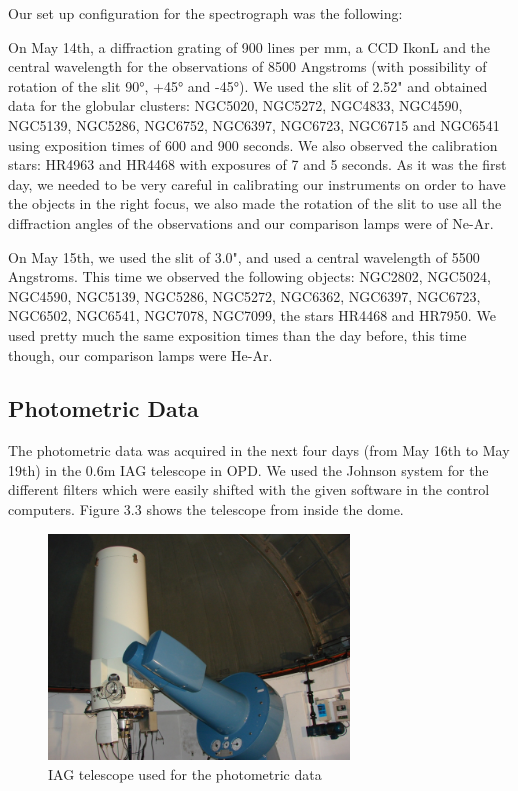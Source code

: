 Our set up configuration for the spectrograph was the following:

On May 14th, a diffraction grating of 900 lines per mm, a CCD IkonL and the central wavelength for the observations of 8500 Angstroms (with possibility of rotation of the slit 90°, +45° and -45°). We used the slit of 2.52" and obtained data for the globular clusters: NGC5020, NGC5272, NGC4833, NGC4590, NGC5139, NGC5286, NGC6752, NGC6397, NGC6723, NGC6715 and NGC6541 using exposition times of 600 and 900 seconds. We also observed the calibration stars: HR4963 and HR4468 with exposures of 7 and 5 seconds. As it was the first day, we needed to be very careful in calibrating our instruments on order to have the objects in the right focus, we also made the rotation of the slit to use all the diffraction angles of the observations and our comparison lamps were of Ne-Ar.

On May 15th, we used the slit of 3.0", and used a central wavelength of 5500 Angstroms. This time we observed the following objects: NGC2802, NGC5024, NGC4590, NGC5139, NGC5286, NGC5272, NGC6362, NGC6397, NGC6723, NGC6502, NGC6541, NGC7078, NGC7099, the stars HR4468 and HR7950. We used pretty much the same exposition times than the day before, this time though, our comparison lamps were He-Ar.

\subsection{Photometric Data}

The photometric data was acquired in the next four days (from May 16th to May 19th) in the 0.6m IAG telescope in OPD. We used the Johnson system for the different filters which were easily shifted with the given software in the control computers. Figure 3.3 shows the telescope from inside the dome.

\begin{figure}[H]
\centering
\includegraphics[width=8cm]{images/opd-photometry.jpg}
\caption[IAG Telescope used for Photometry]{IAG telescope used for the photometric data}
\end{figure}

